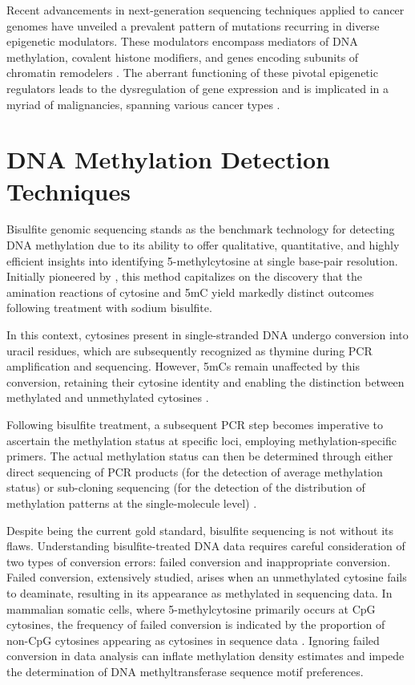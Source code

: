 Recent advancements in next-generation sequencing techniques applied to cancer genomes have unveiled a prevalent pattern of mutations recurring in diverse epigenetic modulators. These modulators encompass mediators of DNA methylation, covalent histone modifiers, and genes encoding subunits of chromatin remodelers \citep{meth_cancer}. The aberrant functioning of these pivotal epigenetic regulators leads to the dysregulation of gene expression and is implicated in a myriad of malignancies, spanning various cancer types \citep{meth_cancer2}.

\section{DNA Methylation Detection Techniques}

Bisulfite genomic sequencing stands as the benchmark technology for detecting DNA methylation due to its ability to offer qualitative, quantitative, and highly efficient insights into identifying 5-methylcytosine at single base-pair resolution. Initially pioneered by \cite{bisulfite_ori}, this method capitalizes on the discovery that the amination reactions of cytosine and \ac{5mC} yield markedly distinct outcomes following treatment with sodium bisulfite.

In this context, cytosines present in single-stranded DNA undergo conversion into uracil residues, which are subsequently recognized as thymine during \ac{PCR} amplification and sequencing. However, \acp{5mC} remain unaffected by this conversion, retaining their cytosine identity and enabling the distinction between methylated and unmethylated cytosines \citep{bisulfite2}. 

Following bisulfite treatment, a subsequent \ac{PCR} step becomes imperative to ascertain the methylation status at specific loci, employing methylation-specific primers. The actual methylation status can then be determined through either direct sequencing of \ac{PCR} products (for the detection of average methylation status) or sub-cloning sequencing (for the detection of the distribution of methylation patterns at the single-molecule level) \citep{bisulfite2}.

Despite being the current gold standard, bisulfite sequencing is not without its flaws. Understanding bisulfite-treated DNA data requires careful consideration of two types of conversion errors: failed conversion and inappropriate conversion. Failed conversion, extensively studied, arises when an unmethylated cytosine fails to deaminate, resulting in its appearance as methylated in sequencing data. In mammalian somatic cells, where 5-methylcytosine primarily occurs at \ac{CpG} cytosines, the frequency of failed conversion is indicated by the proportion of non-\ac{CpG} cytosines appearing as cytosines in sequence data \citep{bisulfite_failed_conv}. Ignoring failed conversion in data analysis can inflate methylation density estimates and impede the determination of DNA methyltransferase sequence motif preferences.

